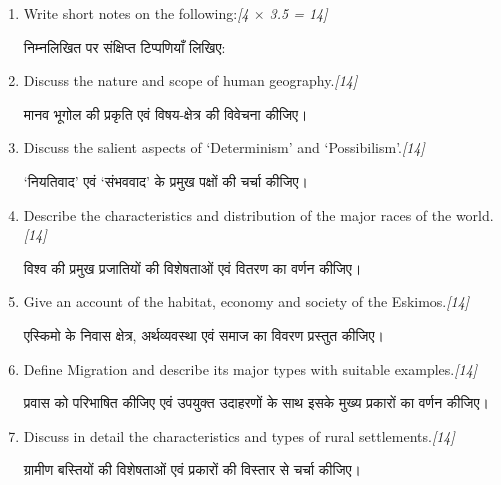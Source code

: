 \documentclass[11pt,a4paper]{article}
\newcommand{\pts}[1]{\hfill \textit{[#1]}}
\begin{document}
\begin{enumerate}[label=\textbf{\arabic*.},leftmargin=*,itemsep=14pt]

  \item Write short notes on the following:\pts{4 $\times$ 3.5 = 14}
  
  निम्नलिखित पर संक्षिप्त टिप्पणियाँ लिखिए:

  \item Discuss the nature and scope of human geography.\pts{14}
  
  मानव भूगोल की प्रकृति एवं विषय-क्षेत्र की विवेचना कीजिए।

  \item Discuss the salient aspects of `Determinism' and `Possibilism'.\pts{14}
  
  `नियतिवाद' एवं `संभववाद' के प्रमुख पक्षों की चर्चा कीजिए।

  \item Describe the characteristics and distribution of the major races of the world.\pts{14}
  
  विश्व की प्रमुख प्रजातियों की विशेषताओं एवं वितरण का वर्णन कीजिए।

  \item Give an account of the habitat, economy and society of the Eskimos.\pts{14}
  
  एस्किमो के निवास क्षेत्र, अर्थव्यवस्था एवं समाज का विवरण प्रस्तुत कीजिए।

  \item Define Migration and describe its major types with suitable examples.\pts{14}
  
  प्रवास को परिभाषित कीजिए एवं उपयुक्त उदाहरणों के साथ इसके मुख्य प्रकारों का वर्णन कीजिए।

  \item Discuss in detail the characteristics and types of rural settlements.\pts{14}
  
  ग्रामीण बस्तियों की विशेषताओं एवं प्रकारों की विस्तार से चर्चा कीजिए।

\end{enumerate}
\end{document}
